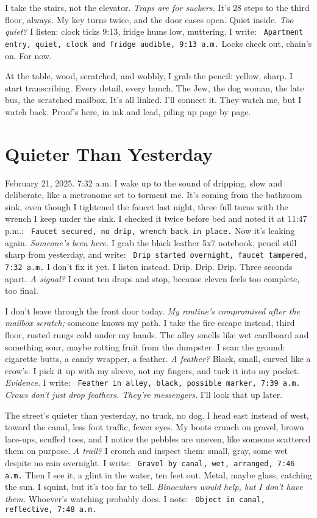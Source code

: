\documentclass[12pt]{article}
\newcommand{\note}[1]{\texttt{\small \color{DarkGray} #1}}
\begin{document}
I take the stairs, not the elevator. \textit{Traps are for suckers.} It’s 28 steps to the third floor, always. My key turns twice, and the door eases open. Quiet inside. \textit{Too quiet?} I listen: clock ticks 9:13, fridge hums low, muttering. I write: \note{Apartment entry, quiet, clock and fridge audible, 9:13 a.m.} Locks check out, chain’s on. For now.

At the table, wood, scratched, and wobbly, I grab the pencil: yellow, sharp. I start transcribing. Every detail, every hunch. The Jew, the dog woman, the late bus, the scratched mailbox. It’s all linked. I’ll connect it. They watch me, but I watch back. Proof’s here, in ink and lead, piling up page by page.

\section{Quieter Than Yesterday}

February 21, 2025. 7:32 a.m. I wake up to the sound of dripping, slow and deliberate, like a metronome set to torment me. It’s coming from the bathroom sink, even though I tightened the faucet last night, three full turns with the wrench I keep under the sink. I checked it twice before bed and noted it at 11:47 p.m.: \note{Faucet secured, no drip, wrench back in place.} Now it’s leaking again. \textit{Someone’s been here.} I grab the black leather 5x7 notebook, pencil still sharp from yesterday, and write: \note{Drip started overnight, faucet tampered, 7:32 a.m.} I don’t fix it yet. I listen instead. Drip. Drip. Drip. Three seconds apart. \textit{A signal?} I count ten drops and stop, because eleven feels too complete, too final.

I don’t leave through the front door today. \textit{My routine’s compromised after the mailbox scratch;} someone knows my path. I take the fire escape instead, third floor, rusted rungs cold under my hands. The alley smells like wet cardboard and something sour, maybe rotting fruit from the dumpster. I scan the ground: cigarette butts, a candy wrapper, a feather. \textit{A feather?} Black, small, curved like a crow’s. I pick it up with my sleeve, not my fingers, and tuck it into my pocket. \textit{Evidence.} I write: \note{Feather in alley, black, possible marker, 7:39 a.m.} \textit{Crows don’t just drop feathers. They’re messengers.} I’ll look that up later.

The street’s quieter than yesterday, no truck, no dog. I head east instead of west, toward the canal, less foot traffic, fewer eyes. My boots crunch on gravel, brown lace-ups, scuffed toes, and I notice the pebbles are uneven, like someone scattered them on purpose. \textit{A trail?} I crouch and inspect them: small, gray, some wet despite no rain overnight. I write: \note{Gravel by canal, wet, arranged, 7:46 a.m.} Then I see it, a glint in the water, ten feet out. Metal, maybe glass, catching the sun. I squint, but it’s too far to tell. \textit{Binoculars would help, but I don’t have them.} Whoever’s watching probably does. I note: \note{Object in canal, reflective, 7:48 a.m.}
\end{document}
